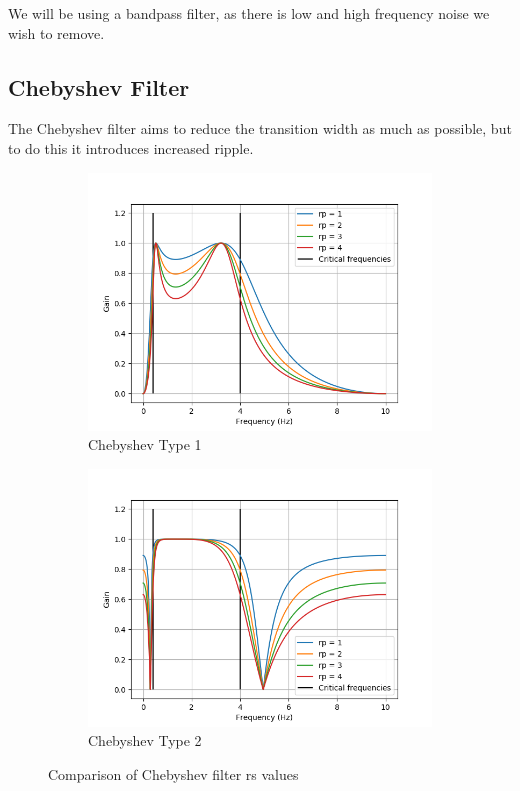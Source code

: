 \documentclass[12pt,a4paper,twoside,openright]{report}
\begin{document}
We will be using a bandpass filter, as there is low and high frequency noise
we wish to remove.

\subsection{Chebyshev Filter}

The Chebyshev filter aims to reduce the transition width as much as possible,
but to do this it introduces increased ripple.

\begin{figure}[h]
\begin{subfigure}{.5\textwidth}
  \centering
  \includegraphics[width=\linewidth]{figs/cheby1-rp-comparison.png}
  \caption{Chebyshev Type 1}
  \label{fig:cheby1rs}
\end{subfigure}%
\begin{subfigure}{.5\textwidth}
  \centering
  \includegraphics[width=\linewidth]{figs/cheby2-rp-comparison.png}
  \caption{Chebyshev Type 2}
  \label{fig:cheby2rs}
\end{subfigure}
\caption{Comparison of Chebyshev filter rs values}
\label{fig:chebyrs}
\end{figure}
\end{document}
